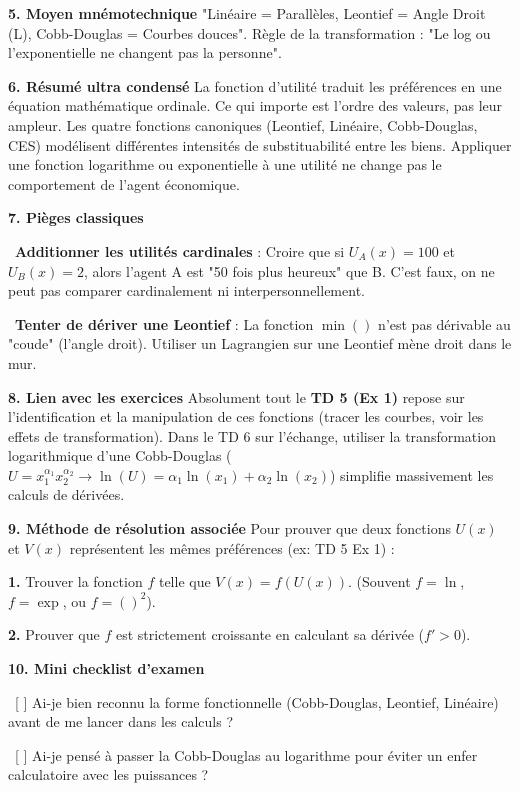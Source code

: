 \documentclass[11pt, a4paper]{report}
\begin{document}
\textbf{5. Moyen mnémotechnique}
"Linéaire = Parallèles, Leontief = Angle Droit (L), Cobb-Douglas = Courbes douces".
Règle de la transformation : "Le log ou l'exponentielle ne changent pas la personne".

\textbf{6. Résumé ultra condensé}
La fonction d'utilité traduit les préférences en une équation mathématique ordinale. Ce qui importe est l'ordre des valeurs, pas leur ampleur. Les quatre fonctions canoniques (Leontief, Linéaire, Cobb-Douglas, CES) modélisent différentes intensités de substituabilité entre les biens. Appliquer une fonction logarithme ou exponentielle à une utilité ne change pas le comportement de l'agent économique.

\textbf{7. Pièges classiques}
\par \textbullet\ \textbf{Additionner les utilités cardinales} : Croire que si $U_A(x) = 100$ et $U_B(x) = 2$, alors l'agent A est "50 fois plus heureux" que B. C'est faux, on ne peut pas comparer cardinalement ni interpersonnellement.
\par \textbullet\ \textbf{Tenter de dériver une Leontief} : La fonction $\min()$ n'est pas dérivable au "coude" (l'angle droit). Utiliser un Lagrangien sur une Leontief mène droit dans le mur.

\textbf{8. Lien avec les exercices}
Absolument tout le \textbf{TD 5 (Ex 1)} repose sur l'identification et la manipulation de ces fonctions (tracer les courbes, voir les effets de transformation). Dans le TD 6 sur l'échange, utiliser la transformation logarithmique d'une Cobb-Douglas ($U = x_1^{\alpha_1} x_2^{\alpha_2} \rightarrow \ln(U) = \alpha_1 \ln(x_1) + \alpha_2 \ln(x_2)$) simplifie massivement les calculs de dérivées. 

\textbf{9. Méthode de résolution associée}
Pour prouver que deux fonctions $U(x)$ et $V(x)$ représentent les mêmes préférences (ex: TD 5 Ex 1) :
\par \textbf{1.} Trouver la fonction $f$ telle que $V(x) = f(U(x))$. (Souvent $f = \ln$, $f = \exp$, ou $f = ()^2$).
\par \textbf{2.} Prouver que $f$ est strictement croissante en calculant sa dérivée ($f' > 0$).

\textbf{10. Mini checklist d’examen}
\par \textbullet\ [ ] Ai-je bien reconnu la forme fonctionnelle (Cobb-Douglas, Leontief, Linéaire) avant de me lancer dans les calculs ?
\par \textbullet\ [ ] Ai-je pensé à passer la Cobb-Douglas au logarithme pour éviter un enfer calculatoire avec les puissances ?
\end{document}
